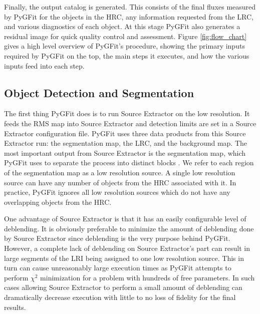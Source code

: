 \documentclass[apj]{emulateapj}
\newcommand{\pygfit}{PyGFit}
\newcommand{\extractor}{Source Extractor}
\begin{document}
Finally, the output catalog is generated.  This consists of the final fluxes measured by \pygfit{} for the objects in the HRC, any information requested from the LRC, and various diagnostics of each object.  At this stage \pygfit{} also generates a residual image for quick quality control and assessment.  Figure \ref{fig:flow_chart} gives a high level overview of \pygfit{}'s procedure, showing the primary inputs required by \pygfit{} on the top, the main steps it executes, and how the various inputs feed into each step.

\begin{figure*}
\caption{A flow chart of \pygfit{}'s procedure.  Rectangles denote computational processes executed by \pygfit{} while the page symbols denote data products created by or used by \pygfit{}.  The five data products along the top are inputs which must be provided to \pygfit{}.}\label{fig:flow_chart}
\end{figure*}

\subsection{Object Detection and Segmentation}\label{sec:segmentation}

The first thing \pygfit{} does is to run \extractor{} on the low resolution.  It feeds the RMS map into \extractor{} and detection limits are set in a \extractor{} configuration file.  \pygfit{} uses three data products from this \extractor{} run: the segmentation map, the LRC, and the background map.  The most important output from \extractor{} is the segmentation map, which \pygfit{} uses to separate the process into distinct blocks .  We refer to each region of the segmentation map as a low resolution source.  A single low resolution source can have any number of objects from the HRC associated with it.  In practice, \pygfit{} ignores all low resolution sources which do not have any overlapping objects from the HRC.

One advantage of \extractor{} is that it has an easily configurable level of deblending.  It is obviously preferable to minimize the amount of deblending done by \extractor{} since deblending is the very purpose behind \pygfit{}.  However, a complete lack of deblending on \extractor{}'s part can result in large segments of the LRI being assigned to one low resolution source.  This in turn can cause unreasonably large execution times as \pygfit{} attempts to perform $\chi^2$ minimization for a problem with hundreds of free parameters.  In such cases allowing \extractor{} to perform a small amount of deblending can dramatically decrease execution with little to no loss of fidelity for the final results.
\end{document}
